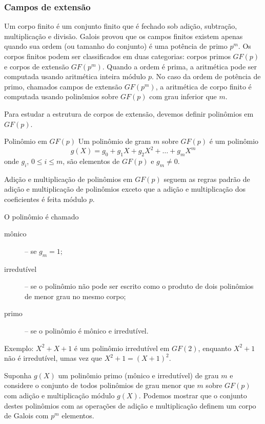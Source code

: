 \begin{frame}[allowframebreaks]
  \frametitle{Campos de extensão}

  Um corpo finito é um conjunto finito que é fechado sob adição, subtração,
  multiplicação e divisão. Galois provou que os campos finitos existem apenas
  quando sua ordem (ou tamanho do conjunto) é uma potência de primo $p^m$. 
  Os corpos finitos podem ser classificados em duas categorias: corpos primos $GF(p)$ e corpos de extensão $GF(p^m)$.
  Quando a ordem é prima, a aritmética pode ser computada usando aritmética inteira módulo $p$.
  No caso da ordem de potência de primo, chamados campos de extensão $GF(p^m)$,
  a aritmética de corpo finito é computada usando polinômios sobre $GF(p)$ com grau inferior que $m$. 


  Para estudar a estrutura de corpos de extensão, devemos definir polinômios em $GF(p)$.
  \begin{block}{Polinômio em $GF(p)$}
    Um polinômio de gram $m$ sobre $GF(p)$ é um polinômio
    \begin{equation}
      g(X) = g_0 + g_1 X + g_2 X^2 + \ldots + g_m X^m
    \end{equation}
    onde $g_i$, $0 \leq i \leq m$, são elementos de $GF(p)$ e $g_m \neq 0$.
  \end{block}
  Adição e multiplicação de polinômios em $GF(p)$ seguem as regras padrão de adição e multiplicação de polinômios exceto que
  a adição e multiplicação dos coeficientes é feita módulo $p$.

  \vspace{3ex}
  O polinômio é chamado
  \begin{description}
    \item[mônico] -- se $g_m = 1$;
    \item[irredutível] -- se o polinômio não pode ser escrito como o produto de dois polinômios de menor grau no mesmo corpo;
    \item[primo] -- se o polinômio é mônico e irredutível.
  \end{description}
  Exemplo: $X^2 + X + 1$ é um polinômio irredutível em $GF(2)$, enquanto $X^2+1$ não é irredutível, umas vez que $X^2+1 = (X+1)^2$.

  \framebreak
  Suponha $g(X)$ um polinômio primo (mônico e irredutível) de grau $m$ e considere o conjunto de todos polinômios de grau menor que $m$ sobre $GF(p)$
  com adição e multiplicação módulo $g(X)$. Podemos mostrar que o conjunto destes polinômios com as operações de adição e multiplicação definem um corpo de Galois com $p^m$ elementos.


\end{frame}

